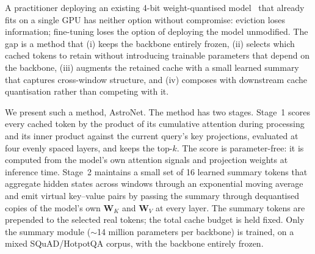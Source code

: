 \documentclass[sn-nature,Numbered]{sn-jnl}
\begin{document}
A practitioner deploying an existing 4-bit weight-quantised model~\cite{dettmers2023nf4,frantar2023gptq,lin2024awq,xiao2023smoothquant} that already fits on a single GPU has neither option without compromise: eviction loses information; fine-tuning loses the option of deploying the model unmodified. The gap is a method that (i) keeps the backbone entirely frozen, (ii) selects which cached tokens to retain without introducing trainable parameters that depend on the backbone, (iii) augments the retained cache with a small learned summary that captures cross-window structure, and (iv) composes with downstream cache quantisation rather than competing with it.

We present such a method, AstroNet. The method has two stages. Stage~1 scores every cached token by the product of its cumulative attention during processing and its inner product against the current query's key projections, evaluated at four evenly spaced layers, and keeps the top-$k$. The score is parameter-free: it is computed from the model's own attention signals and projection weights at inference time. Stage~2 maintains a small set of 16 learned summary tokens that aggregate hidden states across windows through an exponential moving average and emit virtual key--value pairs by passing the summary through dequantised copies of the model's own $\mathbf{W}_K$ and $\mathbf{W}_V$ at every layer. The summary tokens are prepended to the selected real tokens; the total cache budget is held fixed. Only the summary module ($\sim$14 million parameters per backbone) is trained, on a mixed SQuAD/HotpotQA corpus, with the backbone entirely frozen.
\end{document}
